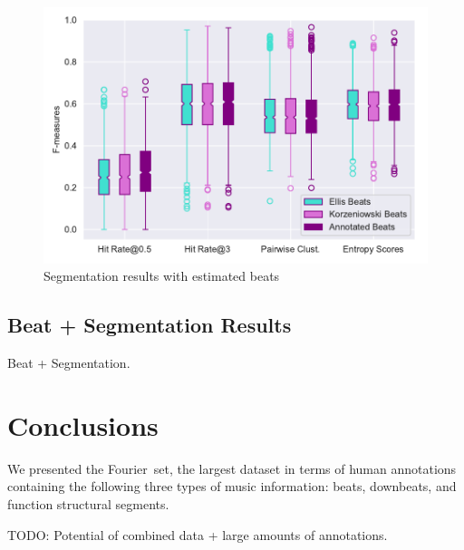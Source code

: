 \documentclass{article}
\newcommand{\setName}{Fourier}
\begin{document}
\begin{figure}
    \centerline{\includegraphics[width=\columnwidth]{figs/segment_results.pdf}}
    \caption{Segmentation results with estimated beats}
    \label{fig:segment_results}
\end{figure}

\subsection{Beat + Segmentation Results}

Beat + Segmentation.

\section{Conclusions}\label{sec:conclusions}

We presented the \setName~set, the largest dataset in terms of human annotations containing the following three types of music information: beats, downbeats, and function structural segments.

TODO: Potential of combined data + large amounts of annotations.


\end{document}
